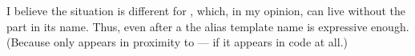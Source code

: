 I believe the situation is different for \std{}, which,
in my opinion, can live without the  part in its name.
Thus, even after a  the alias template name
 is expressive enough.
(Because  only appears in proximity to  --- if it
appears in code at all.)
